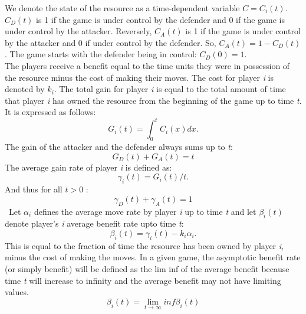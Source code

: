 We denote the state of the resource as a time-dependent variable $C=C_{i}(t)$. 
$C_{D}(t)$ is 1 if the game is under control by the defender and 0 if the game is under control by the attacker. Reversely, $C_{A}(t)$ is 1 if the game is under control by the attacker and 0 if under control by the defender. So, $C_{A}(t)= 1 - C_{D}(t)$.
The game starts with the defender being in control: $C_{D}(0)= 1$. \\


The players receive a benefit equal to the time units they were in possession of the resource minus the cost of making their moves. The cost for player \textit{i} is denoted by $k_{i}$. 
The total gain for player \textit{i} is equal to the total amount of time that player \textit{i} has owned the resource from the beginning of the game up to time \textit{t}. It is expressed as follows:
\begin{equation}\label{first}
G_{i}(t) = \int_0^t \! C_{i}(x) dx.
\end{equation}
The gain of the attacker and the defender always sums up to \textit{t}:
\begin{equation}\label{first}
G_{D}(t) + G_{A}(t) = t
\end{equation}
The average gain rate of player \textit{i} is defined as:
\begin{equation}\label{first}
\gamma_{i}(t) = G_{i}(t)/t.
\end{equation}
And thus for all $t > 0$ :
\begin{equation}\label{first}
\gamma_{D}(t) + \gamma_{A}(t) = 1
\end{equation}
~Let $ \alpha_{i}$ defines the average move rate by player \textit{i} up to time \textit{t} and let $\beta_{i}(t)$ denote player's \textit{i} average benefit rate upto time \textit{t}:
\begin{equation}\label{first}
\beta_{i}(t) = \gamma_{i}(t) - k_{i}\alpha_{i}.
\end{equation}
This is equal to the fraction of time the resource has been owned by player \textit{i}, minus the cost of making the moves.
In a given game, the asymptotic benefit rate (or simply benefit) will be defined as the lim inf of the average benefit because time\textit{ t} will increase to infinity and the average benefit may not have limiting values.
\begin{equation}
\beta_{i}(t)  = \lim_{t \to \infty} inf \beta_{i}(t) 
\end{equation}
\\



